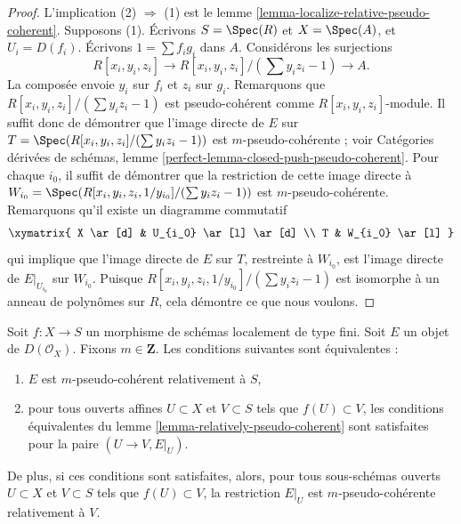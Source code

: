 \begin{proof}
L'implication (2) $\Rightarrow$ (1) est le
lemme \ref{lemma-localize-relative-pseudo-coherent}.
Supposons (1). Écrivons $S = \Spec(R)$ et $X = \Spec(A)$, et
$U_i = D(f_i)$. Écrivons $1 = \sum f_ig_i$ dans $A$.
Considérons les surjections
$$
R[x_i, y_i, z_i] \to R[x_i, y_i, z_i]/(\sum y_iz_i - 1) \to A.
$$
La composée envoie $y_i$ sur $f_i$ et $z_i$ sur $g_i$. Remarquons que
$R[x_i, y_i, z_i]/(\sum y_iz_i - 1)$ est pseudo-cohérent comme
$R[x_i, y_i, z_i]$-module. Il suffit donc de démontrer que
l'image directe de $E$ sur $T = \Spec(R[x_i, y_i, z_i]/(\sum y_iz_i - 1))$
est $m$-pseudo-cohérente ; voir
Catégories dérivées de schémas,
lemme \ref{perfect-lemma-closed-push-pseudo-coherent}.
Pour chaque $i_0$, il suffit de démontrer que la restriction de cette
image directe à
$W_{i_0} = \Spec(R[x_i, y_i, z_i, 1/y_{i_0}]/(\sum y_iz_i - 1))$
est $m$-pseudo-cohérente. Remarquons qu'il existe un diagramme commutatif
$$
\xymatrix{
X \ar[d] & U_{i_0} \ar[l] \ar[d] \\
T & W_{i_0} \ar[l]
}
$$
qui implique que l'image directe de $E$ sur $T$, restreinte à $W_{i_0}$,
est l'image directe de $E|_{U_{i_0}}$ sur $W_{i_0}$. Puisque
$R[x_i, y_i, z_i, 1/y_{i_0}]/(\sum y_iz_i - 1)$ est isomorphe
à un anneau de polynômes sur $R$, cela démontre ce que nous voulons.
\end{proof}

\begin{lemma}
\label{lemma-relative-pseudo-coherence-characterize}
Soit $f : X \to S$ un morphisme de schémas localement de type fini.
Soit $E$ un objet de $D(\mathcal{O}_X)$.
Fixons $m \in \mathbf{Z}$. Les conditions suivantes sont équivalentes :
\begin{enumerate}
\item $E$ est $m$-pseudo-cohérent relativement à $S$,
\item pour tous ouverts affines $U \subset X$ et $V \subset S$
tels que $f(U) \subset V$, les conditions équivalentes du
lemme \ref{lemma-relatively-pseudo-coherent}
sont satisfaites pour la paire $(U \to V, E|_U)$.
\end{enumerate}
De plus, si ces conditions sont satisfaites, alors, pour tous sous-schémas ouverts
$U \subset X$ et $V \subset S$ tels que $f(U) \subset V$,
la restriction $E|_U$ est $m$-pseudo-cohérente relativement à $V$.
\end{lemma}

